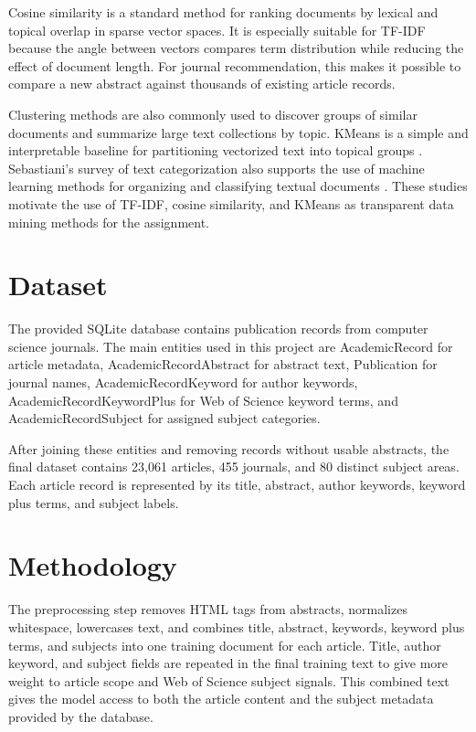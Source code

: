 \documentclass[conference]{IEEEtran}
\begin{document}
Cosine similarity is a standard method for ranking documents by lexical and topical overlap in sparse vector spaces. It is especially suitable for TF-IDF because the angle between vectors compares term distribution while reducing the effect of document length. For journal recommendation, this makes it possible to compare a new abstract against thousands of existing article records.

Clustering methods are also commonly used to discover groups of similar documents and summarize large text collections by topic. KMeans is a simple and interpretable baseline for partitioning vectorized text into topical groups \cite{macqueen1967methods}. Sebastiani's survey of text categorization also supports the use of machine learning methods for organizing and classifying textual documents \cite{sebastiani2002machine}. These studies motivate the use of TF-IDF, cosine similarity, and KMeans as transparent data mining methods for the assignment.

\section{Dataset}
The provided SQLite database contains publication records from computer science journals. The main entities used in this project are AcademicRecord for article metadata, AcademicRecordAbstract for abstract text, Publication for journal names, AcademicRecordKeyword for author keywords, AcademicRecordKeywordPlus for Web of Science keyword terms, and AcademicRecordSubject for assigned subject categories.

After joining these entities and removing records without usable abstracts, the final dataset contains 23,061 articles, 455 journals, and 80 distinct subject areas. Each article record is represented by its title, abstract, author keywords, keyword plus terms, and subject labels.

\section{Methodology}
The preprocessing step removes HTML tags from abstracts, normalizes whitespace, lowercases text, and combines title, abstract, keywords, keyword plus terms, and subjects into one training document for each article. Title, author keyword, and subject fields are repeated in the final training text to give more weight to article scope and Web of Science subject signals. This combined text gives the model access to both the article content and the subject metadata provided by the database.
\end{document}
